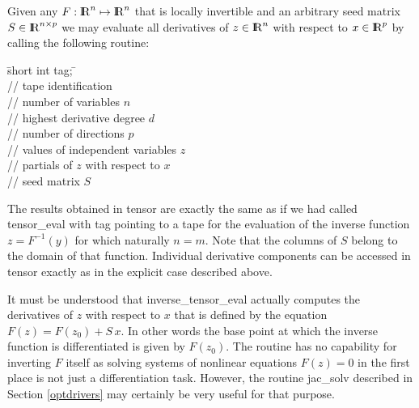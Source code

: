 \documentclass[11pt,twoside]{article}
\newcommand{\R}{{ {\rm I} \kern -.225em {\rm R} }}
\begin{document}
Given any $ F : \R^n \mapsto \R^n $ that is locally invertible and an arbitrary
seed matrix $S \in \R^{n \times p}$ we may evaluate all derivatives of $z \in \R^n$
with respect to $x \in \R^p$ by calling the following routine: 
%
\begin{tabbing}
\hspace{0.5in}\={\sf short int tag;} \hspace{1.1in}\= \kill    %
\\
         \> // tape identification \\
                 \> // number of variables $n$\\
                 \> // highest derivative degree $d$\\
                 \> // number of directions $p$\\
          \> // values of independent variables $z$\\
\> // partials of $z$ with respect to $x$\\
        \> // seed matrix $S$
\end{tabbing}                 
%                 
The results obtained in {\sf tensor} are exactly the same as if we had called {\sf tensor\_eval} with 
{\sf tag} pointing to a tape for the evaluation of the inverse function 
$z=F^{-1}(y)$ for which naturally $n=m$. Note that the columns of $S$ belong 
to the domain of that function. Individual derivative components can be 
accessed in tensor exactly as in the explicit case described above. 

It must be understood that {\sf inverse\_tensor\_eval} actually computes the
derivatives of $z$ with respect to $x$ that is defined by the equation
$F(z)=F(z_0)+S \, x$. In other words the base point at
which the inverse function is differentiated is given by $F(z_0)$.
The routine has no capability for inverting $F$ itself as
solving systems of nonlinear
equations $F(z)=0$ in the first place is not just a differentiation task.
However, the routine {\sf jac\_solv} described in Section \ref{optdrivers} may certainly be very
useful for that purpose. 
\end{document}

